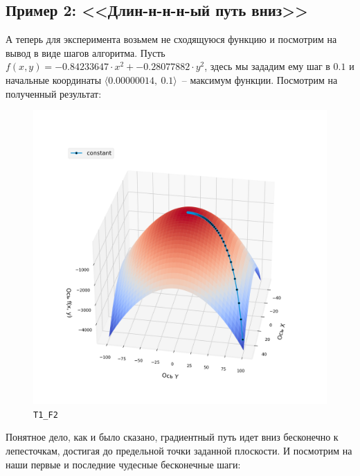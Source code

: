 \documentclass[12pt, a4paper, oneside, final]{article}
\begin{document}
	\subsection*{Пример 2: <<Длин-н-н-н-ый путь вниз>>}
	А теперь для эксперимента возьмем не сходящуюся функцию и посмотрим на вывод в виде шагов алгоритма. Пусть $f(x, y) = -0.84233647 \cdot x^{2} + -0.28077882 \cdot y^{2}$, здесь мы зададим ему шаг в $0.1$ и начальные координаты $\langle 0.00000014, ~ 0.1 \rangle$~-- максимум функции. Посмотрим на полученный результат:
	\begin{figure}[H]
		\centering
		\includegraphics[scale=0.68]{Image/T1_F2.png}
		\caption*{\texttt{T1\_F2}}
	\end{figure}
	Понятное дело, как и было сказано, градиентный путь идет вниз бесконечно к лепесточкам, достигая до предельной точки заданной плоскости. И посмотрим на наши первые и последние чудесные бесконечные шаги:
\end{document}
